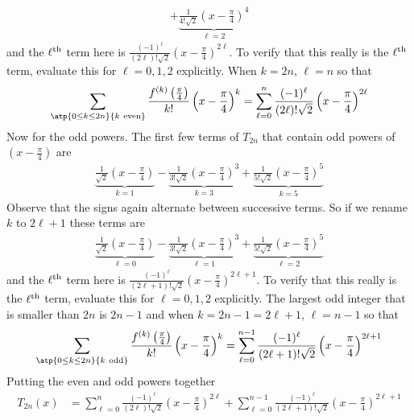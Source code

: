 \begin{solution}
\begin{align*}
+\underbrace{\frac{1}{4!\sqrt{2}}\left(x-\frac{\pi}{4}\right)^{4}}_{\ell=2}
\end{align*}
and the $\ell^{\rm th}$ term here is 
$\frac{(-1)^\ell}{(2\ell)!\sqrt{2}}\left(x-\frac{\pi}{4}\right)^{2\ell}$. To verify that this really is the $\ell^{\rm th}$ term, evaluate this for $\ell=0,1,2$ explicitly. When $k=2n$, $\ell=n$ so that
\begin{align*}
\sum_{\atp{0\le k\le 2n}{k{\rm\ even}}} \frac{f^{(k)}\left(\frac{\pi}{4}\right)}{k!}\left(x-\frac{\pi}{4}\right)^k
=\sum_{\ell=0}^{n}\frac{(-1)^\ell}{(2\ell)!\sqrt{2}}\left(x-\frac{\pi}{4}\right)^{2\ell}
\end{align*}
Now for the odd powers.  The first few terms of $T_{2n}$ that contain odd powers of $\left(x-\frac{\pi}{4}\right)$ are
\begin{align*}
\underbrace{\frac{1}{\sqrt{2}}\left(x-\frac{\pi}{4}\right)}_{k=1}
-\underbrace{\frac{1}{3!\sqrt{2}}\left(x-\frac{\pi}{4}\right)^{3}}_{k=3}
+\underbrace{\frac{1}{5!\sqrt{2}}\left(x-\frac{\pi}{4}\right)^{5}}_{k=5}
\end{align*}
Observe that the signs again alternate between successive terms. So if we rename $k$ to $2\ell+1$ these terms are
\begin{align*}
\underbrace{\frac{1}{\sqrt{2}}\left(x-\frac{\pi}{4}\right)}_{\ell=0}
-\underbrace{\frac{1}{3!\sqrt{2}}\left(x-\frac{\pi}{4}\right)^{3}}_{\ell=1}
+\underbrace{\frac{1}{5!\sqrt{2}}\left(x-\frac{\pi}{4}\right)^{5}}_{\ell=2}
\end{align*}
and the $\ell^{\rm th}$ term here is 
$\frac{(-1)^\ell}{(2\ell+1)!\sqrt{2}}\left(x-\frac{\pi}{4}\right)^{2\ell+1}$. 
To verify that this really is the $\ell^{\rm th}$ term, evaluate this for $\ell=0,1,2$ explicitly.
The largest odd integer that is smaller than $2n$ is $2n-1$ and when $k=2n-1=2\ell+1$, 
$\ell=n-1$ so that
\begin{align*}
\sum_{\atp{0\le k\le 2n}{k{\rm\ odd}}} \frac{f^{(k)}\left(\frac{\pi}{4}\right)}{k!}\left(x-\frac{\pi}{4}\right)^k
=\sum_{\ell=0}^{n-1}\frac{(-1)^\ell}{(2\ell+1)!\sqrt{2}}\left(x-\frac{\pi}{4}\right)^{2\ell+1}
\end{align*}
Putting the even and odd powers together
\begin{align*}
T_{2n}(x)&=\sum_{\ell=0}^{n}\frac{(-1)^\ell}{(2\ell)!\sqrt{2}}\left(x-\frac{\pi}{4}\right)^{2\ell}
+\sum_{\ell=0}^{n-1}\frac{(-1)^\ell}{(2\ell+1)!\sqrt{2}}\left(x-\frac{\pi}{4}\right)^{2\ell+1}
\end{align*}
\end{solution}


